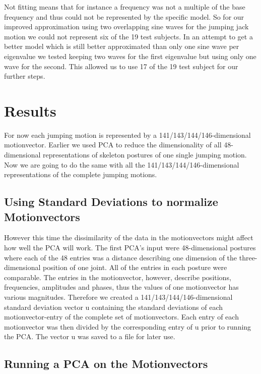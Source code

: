 \documentclass[a4paper]{article}
\begin{document}
Not fitting means that for instance a frequency was not a multiple of the base frequency and thus could not be represented by the specific model.
So for our improved approximation using two overlapping sine waves for the jumping jack motion we could not represent six of the 19 test subjects.
In an attempt to get a better model which is still better approximated than only one sine wave per eigenvalue we tested keeping two waves for the first eigenvalue but using only one wave for the second.
This allowed us to use 17 of the 19 test subject for our further steps.

\section{Results}

For now each jumping motion is represented by a 141/143/144/146-dimensional motionvector.
Earlier we used PCA to reduce the dimensionality of all 48-dimensional representations of skeleton postures of one single jumping motion.
Now we are going to do the same with all the 141/143/144/146-dimensional representations of the complete jumping motions.

\subsection{Using Standard Deviations to normalize Motionvectors}

However this time the dissimilarity of the data in the motionvectors might affect how well the PCA will work.
The first PCA's input were 48-dimensional postures where each of the 48 entries was a distance describing one dimension of the three-dimensional position of one joint.
All of the entries in each posture were comparable.
The entries in the motionvector, however, describe positions, frequencies, amplitudes and phases, thus the values of one motionvector has various magnitudes.
Therefore we created a 141/143/144/146-dimensional standard deviation vector u containing the standard deviations of each motionvector-entry of the complete set of motionvectors.
Each entry of each motionvector was then divided by the corresponding entry of u prior to running the PCA.
The vector u was saved to a file for later use.

\subsection{Running a PCA on the Motionvectors}
\end{document}
